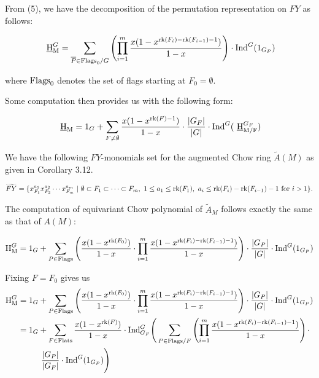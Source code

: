 \documentclass[11pt]{article}
\newcommand{\ind}{\text{\normalfont Ind}}
\newcommand{\hilbM}{\normalfont\text{ \underline{H}}_\text{M}}
\newcommand{\aughilbM}{\normalfont\text{H}_\text{M}}
\newcommand{\rank}{\normalfont\text{rk}}
\newcommand{\flats}{\normalfont\text{Flats}}
\newcommand{\flags}{\normalfont\text{Flags}}
\newcommand{\hilbMmodF}{\normalfont\text{ \underline{H}}_\text{M/F}}
\theoremstyle{remark}
\begin{document}
From (5), we have the decomposition of the permutation representation on $FY$ as follows:

$$\hilbM^G = \sum_{\overline{P}\in\flags_0/G}\left(\prod_{i=1}^m{
    \frac{x(1-x^{\rank(F_i)-\rank(F_{i-1})-1})}{1-x}}\right)\cdot\ind^G(1_{G_P})$$
    
where $\flags_0$ denotes the set of flags starting at $F_0=\emptyset$.

\hrulefill

Some computation then provides us with the following form:

$$\hilbM = 1_G + \sum_{F\neq \emptyset}{\frac{x(1-x^{\rank(F)-1})}{1-x}\cdot
\frac{|G_F|}{|G|}\cdot \ind^G(\hilbMmodF^{G_F})}$$

\hrulefill

We have the following $FY$-monomials set for the augmented Chow ring
$\widetilde{A}(M)$
as given in \cite{liao2022stembridgecodeschowrings}
Corollary 3.12.

$\widetilde{FY} = \{x_{F_1}^{a_1}x_{F_2}^{a_2}\cdots x_{F_m}^{a_m}\ 
|\ \emptyset\subset F_1\subset\cdots\subset F_m,\ 1\leq a_1\leq \rank(F_1)
,\ a_i\leq\rank(F_i)-\rank(F_{i-1})-1\ \text{for } i>1\}.$

The computation of equivariant Chow polynomial of $\widetilde{A}_M$
follows exactly the same as that of $A(M)$:

$$\aughilbM^G = 1_G + \sum_{P\in \flags}
{\left(\frac{x(1-x^{\rank(F_0)})}{1-x}
\cdot\prod_{i=1}^m{\frac{x(1-x^{\rank(F_i)-\rank(F_{i-1})-1})}{1-x}}\right)
\cdot\frac{|G_P|}{|G|}\cdot\ind^G(1_{G_P})}$$

Fixing $F=F_0$ gives us
\begin{align*}
    \aughilbM^G &= 1_G + \sum_{P\in \flags}
    \left(\frac{x(1-x^{\rank(F_0)})}{1-x}
    \cdot\prod_{i=1}^m{\frac{x(1-x^{\rank(F_i)-\rank(F_{i-1})-1})}{1-x}}\right)\cdot\frac{|G_P|}{|G|}\cdot\ind^G(1_{G_P}) \\
    &= 1_G + \sum_{F\in \flats}
    \frac{x(1-x^{\rank(F)})}{1-x}
    \cdot\ind_{G_F}^G \Bigg(\sum_{P\in\flags/F}
    \left(\prod_{i=1}^m{\frac{x(1-x^{\rank(F_i)-\rank(F_{i-1})-1})}{1-x}}\right) \cdot \\
    &\hspace*{10mm}\frac{|G_P|}{|G_F|}\cdot\ind^G(1_{G_P})\Bigg)
\end{align*}



\newpage
\printbibliography
\end{document}
